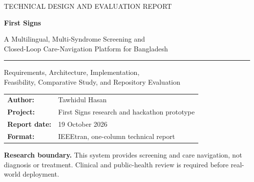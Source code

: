 \documentclass[12pt,onecolumn]{IEEEtran}
\begin{document}
\begin{titlepage}
\thispagestyle{empty}
\vspace*{20mm}
{\color{fsdark}\Large TECHNICAL DESIGN AND EVALUATION REPORT\par}
\vspace{22mm}
{\color{fsdark}\fontsize{30}{36}\selectfont\bfseries First Signs\par}
\vspace{5mm}
{\color{fsmid}\LARGE A Multilingual, Multi-Syndrome Screening and\\[2mm]Closed-Loop Care-Navigation Platform for Bangladesh\par}
\vspace{15mm}\rule{0.72\textwidth}{0.7pt}\par\vspace{8mm}
{\large Requirements, Architecture, Implementation,\\Feasibility, Comparative Study, and Repository Evaluation\par}
\vfill
\begin{tabular}{@{}ll@{}}
\textbf{Author:} & Tawhidul Hasan\\[2mm]
\textbf{Project:} & First Signs research and hackathon prototype\\[2mm]
\textbf{Report date:} & 19 October 2026\\[2mm]
\textbf{Format:} & IEEEtran, one-column technical report
\end{tabular}
\vspace{25mm}
{\color{white}\small\textbf{Research boundary.} This system provides screening and care navigation, not diagnosis or treatment. Clinical and public-health review is required before real-world deployment.\par}
\vspace*{2mm}
\end{titlepage}

\setcounter{page}{1}
\clearpage
\end{document}

